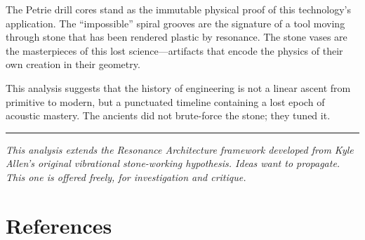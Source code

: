 \documentclass[11pt]{article}
\begin{document}
The Petrie drill cores stand as the immutable physical proof of this technology's application. The ``impossible'' spiral grooves are the signature of a tool moving through stone that has been rendered plastic by resonance. The stone vases are the masterpieces of this lost science---artifacts that encode the physics of their own creation in their geometry.

This analysis suggests that the history of engineering is not a linear ascent from primitive to modern, but a punctuated timeline containing a lost epoch of acoustic mastery. The ancients did not brute-force the stone; they tuned it.

\vspace{2em}
\hrule
\vspace{1em}

\textit{This analysis extends the Resonance Architecture framework developed from Kyle Allen's original vibrational stone-working hypothesis. Ideas want to propagate. This one is offered freely, for investigation and critique.}

\section*{References}


\end{document}
